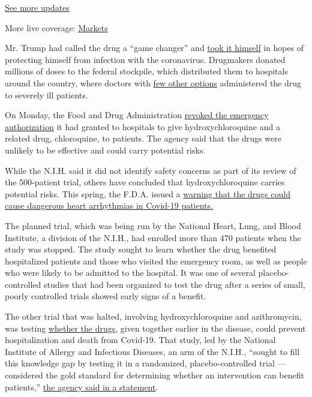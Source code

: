 \href{https://www.nytimes.com/2020/08/01/world/coronavirus-covid-19.html?action=click\&pgtype=Article\&state=default\&region=MAIN_CONTENT_1\&context=storylines_live_updates}{See
more updates}

More live coverage:
\href{https://www.nytimes.com/live/2020/07/31/business/stock-market-today-coronavirus?action=click\&pgtype=Article\&state=default\&region=MAIN_CONTENT_1\&context=storylines_live_updates}{Markets}

Mr. Trump had called the drug a ``game changer'' and
\href{https://www.nytimes.com/2020/05/18/us/politics/trump-hydroxychloroquine-covid-coronavirus.html}{took
it himself} in hopes of protecting himself from infection with the
coronavirus. Drugmakers donated millions of doses to the federal
stockpile, which distributed them to hospitals around the country, where
doctors with
\href{https://www.nytimes.com/2020/04/17/health/trump-hydroxychloroquine-coronavirus.html}{few
other options} administered the drug to severely ill patients.

On Monday, the Food and Drug Administration
\href{https://www.nytimes.com/2020/06/15/health/fda-hydroxychloroquine-malaria.html}{revoked
the emergency authorization} it had granted to hospitals to give
hydroxychloroquine and a related drug, chloroquine, to patients. The
agency said that the drugs were unlikely to be effective and could carry
potential risks.

While the N.I.H. said it did not identify safety concerns as part of its
review of the 500-patient trial, others have concluded that
hydroxychloroquine carries potential risks. This spring, the F.D.A.
issued a
\href{https://www.nytimes.com/2020/04/24/health/fda-hydroxychloroquine-coronavirus.html}{warning
that the drugs could cause dangerous heart arrhythmias in Covid-19
patients.}

The planned trial, which was being run by the National Heart, Lung, and
Blood Institute, a division of the N.I.H., had enrolled more than 470
patients when the study was stopped. The study sought to learn whether
the drug benefited hospitalized patients and those who visited the
emergency room, as well as people who were likely to be admitted to the
hospital. It was one of several placebo-controlled studies that had been
organized to test the drug after a series of small, poorly controlled
trials showed early signs of a benefit.

The other trial that was halted, involving hydroxychloroquine and
azithromycin, was testing
\href{https://www.nih.gov/news-events/news-releases/nih-begins-clinical-trial-hydroxychloroquine-azithromycin-treat-covid-19}{whether
the drugs}, given together earlier in the disease, could prevent
hospitalization and death from Covid-19. That study, led by the National
Institute of Allergy and Infectious Diseases, an arm of the N.I.H.,
``sought to fill this knowledge gap by testing it in a randomized,
placebo-controlled trial --- considered the gold standard for
determining whether an intervention can benefit patients,''
\href{https://www.niaid.nih.gov/news-events/bulletin-nih-clinical-trial-evaluating-hydroxychloroquine-and-azithromycin-covid-19}{the
agency said in a statement}.

